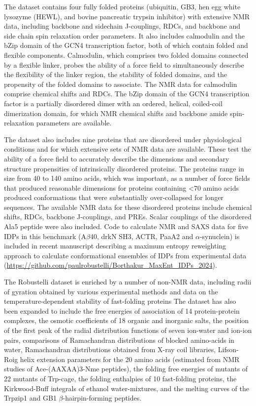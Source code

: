 \documentclass[9pt,review]{livecoms}
\begin{document}
The dataset contains four fully folded proteins (ubiquitin, GB3, hen egg white lysozyme (HEWL), and bovine pancreatic trypsin inhibitor) with extensive NMR data, including backbone and sidechain J-couplings, RDCs, and backbone and side chain spin relaxation order parameters.
It also includes calmodulin and the bZip domain of the GCN4 transcription factor, both of which contain folded and flexible components.
Calmodulin, which comprises two folded domains connected by a flexible linker, probes the ability of a force field to simultaneously describe the flexibility of the linker region, the stability of folded domains, and the propensity of the folded domains to associate.
The NMR data for calmodulin comprise chemical shifts and RDCs.
The bZip domain of the GCN4 transcription factor is a partially disordered dimer with an ordered, helical, coiled-coil dimerization domain, for which NMR chemical shifts and backbone amide spin-relaxation parameters are available. 

The dataset also includes nine proteins that are disordered under physiological conditions and for which extensive sets of NMR data are available.
These test the ability of a force field to accurately describe the dimensions and secondary structure propensities of intrinsically disordered proteins.
The proteins range in size from 40 to 140 amino acids, which was important, as a number of force fields that produced reasonable dimensions for proteins containing <70 amino acids produced conformations that were substantially over-collapsed for longer sequences.
The available NMR data for these disordered proteins include chemical shifts, RDCs, backbone J-couplings, and PREs.
Scalar couplings of the disordered Ala5 peptide were also included. 
Code to calculate NMR and SAXS data for five IDPs in this benchmark (A$\beta$40, drkN SH3, ACTR, PaaA2 and $\alpha$-synuclein) is included in recent manuscript describing a maximum entropy reweighting approach to calculate conformational ensembles of IDPs from experimental data\cite{borthakur2024determining} (\url{https://github.com/paulrobustelli/Borthakur_MaxEnt_IDPs_2024}).  

The Robustelli dataset is enriched by a number of non-NMR data, including radii of gyration obtained by various experimental methods and data on the temperature-dependent stability of fast-folding proteins
The dataset has also been expanded \cite{piana_development_2020} to include the free energies of association of 14 protein-protein complexes, the osmotic coefficients of 18 organic and inorganic salts, the position of the first peak of the radial distribution functions of seven ion-water and ion-ion pairs, comparisons of Ramachandran distributions of blocked amino-acids in water, Ramachandran distributions obtained from X-ray coil libraries, Lifson-Roig helix extension parameters for the 20 amino acids (estimated from NMR studies of Ace-(AAXAA)3-Nme peptides), the folding free energies of mutants of 22 mutants of Trp-cage, the folding enthalpies of 10 fast-folding proteins, the Kirkwood-Buff integrals of ethanol water-mixtures, and the melting curves of the Trpzip1 and GB1 $\beta$-hairpin-forming peptides.
\end{document}
